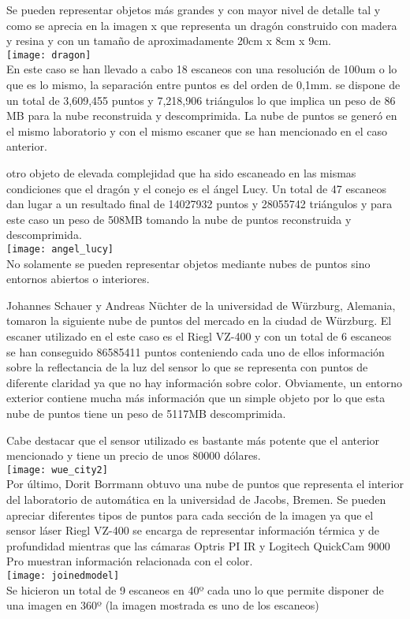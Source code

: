 Se pueden representar objetos más grandes y con mayor nivel de detalle tal y como se aprecia en la imagen x que representa un dragón construido con madera y resina y con un tamaño de aproximadamente 20cm x 8cm x 9cm.
\\
\texttt{[image: dragon]}
\\
En este caso se han llevado a cabo 18 escaneos con una resolución de 100um o lo que es lo mismo, la separación entre puntos es del orden de 0,1mm. se dispone de un total de 3,609,455 puntos y 7,218,906  triángulos lo que implica un peso de 86 MB para la nube reconstruida y descomprimida.
La nube de puntos se generó en el mismo laboratorio y con el mismo escaner que se han mencionado en el caso anterior.

otro objeto de elevada complejidad que ha sido escaneado en las mismas condiciones que el dragón y el conejo es el ángel Lucy. Un total de 47 escaneos dan lugar a un resultado final de 14027932 puntos y 28055742 triángulos y para este caso un peso de 508MB tomando la nube de puntos reconstruida y descomprimida.
\\
\texttt{[image: angel\_lucy]}
\\
No solamente se pueden representar objetos mediante nubes de puntos sino entornos abiertos o interiores.

Johannes Schauer y Andreas Nüchter de la universidad de Würzburg, Alemania, tomaron la siguiente nube de puntos del mercado en la ciudad de Würzburg.
El escaner utilizado en el este caso es el Riegl VZ-400 y con un total de 6 escaneos se han conseguido 86585411 puntos conteniendo cada uno de ellos información sobre la reflectancia de la luz del sensor lo que se representa con puntos de diferente claridad ya que no hay información sobre color. Obviamente, un entorno exterior contiene mucha más información que un simple objeto por lo que esta nube de puntos tiene un peso de 5117MB descomprimida.

Cabe destacar que el sensor utilizado es bastante más potente que el anterior mencionado y tiene un precio de unos 80000 dólares.
\\
\texttt{[image: wue\_city2]}
\\
Por último, Dorit Borrmann obtuvo una nube de puntos que representa el interior del laboratorio de automática en la universidad de Jacobs, Bremen. Se pueden apreciar diferentes tipos de puntos para cada sección de la imagen ya que el sensor láser Riegl VZ-400 se encarga de representar información térmica y de profundidad mientras que las cámaras Optris PI IR y Logitech QuickCam 9000 Pro muestran información relacionada con el color.
\\
\texttt{[image: joinedmodel]}
\\
Se hicieron un total de 9 escaneos en 40º cada uno lo que permite disponer de una imagen en 360º (la imagen mostrada es uno de los escaneos)

